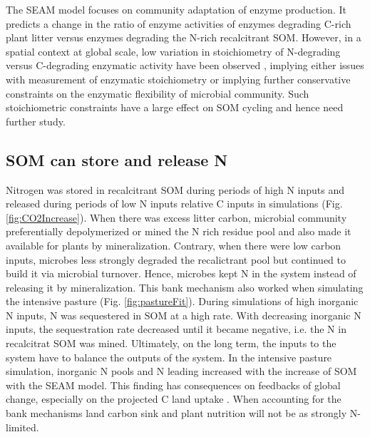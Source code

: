 The SEAM model focuses on community adaptation of enzyme production. It predicts
a change in the ratio of enzyme activities of enzymes degrading C-rich plant
litter versus enzymes degrading the N-rich recalcitrant SOM.
However, in a spatial context at global scale, low variation in stoichiometry
of N-degrading versus C-degrading enzymatic activity have been observed
\citep{Sinsabaugh09}, implying either issues with measurement of enzymatic
stoichiometry or implying further conservative constraints on the enzymatic
flexibility of microbial community.
Such stoichiometric constraints have a large effect on SOM cycling and hence
need further study.

\subsection{SOM can store and release N}
Nitrogen was stored in recalcitrant SOM during periods of high N inputs and
released during periods of low N inputs relative C inputs in simulations (Fig.
\ref{fig:CO2Increase}). When there was excess litter carbon, microbial community
preferentially depolymerized or mined the N rich residue pool and also
made it available for plants by mineralization.
Contrary, when there were low carbon inputs, microbes less strongly degraded the
recalictrant pool but continued to build it via microbial turnover.
Hence, microbes kept N in the system instead of releasing it by mineralization.
This bank mechanism \citep{Perveen14} also worked when simulating the intensive
pasture (Fig. \ref{fig:pastureFit}). During simulations of high inorganic N
inputs, N was sequestered in SOM at a high rate. With decreasing inorganic N
inputs, the sequestration rate decreased until it became negative, i.e. the N
in recalcitrat SOM was mined. Ultimately, on the long term, the inputs to the
system have to balance the outputs of the system. In the intensive pasture simulation,
inorganic N pools and N leading increased with the increase of SOM with the SEAM
model. This finding has consequences on feedbacks of global change, especially
on the projected C land uptake \citep{Friedlingstein14}. When accounting for the
bank mechanisms land carbon sink and plant nutrition will not be as strongly
N-limited.

